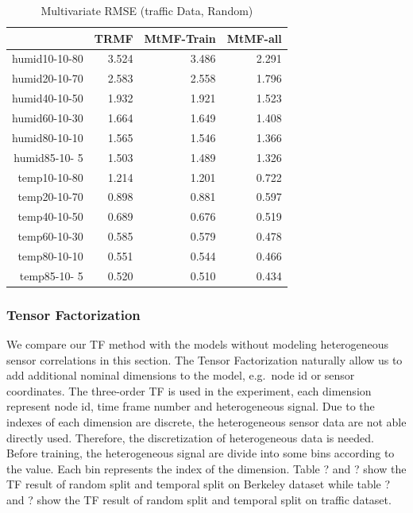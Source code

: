 \begin{table}[htbp]
\caption{Multivariate RMSE (traffic Data, Random)}
\label{traffic}
\begin{tabular}{r | r r r}
	&TRMF	&MtMF-Train	&MtMF-all \\ \hline
humid10-10-80	&3.524 	&3.486 	&2.291\\  
humid20-10-70	&2.583 	&2.558 	&1.796\\
humid40-10-50	&1.932 	&1.921 	&1.523\\
humid60-10-30	&1.664 	&1.649 	&1.408\\
humid80-10-10	&1.565 	&1.546 	&1.366\\
humid85-10- 5	&1.503 	&1.489 	&1.326\\
 temp10-10-80	&1.214 	&1.201 	&0.722\\
 temp20-10-70	&0.898 	&0.881 	&0.597\\
 temp40-10-50	&0.689 	&0.676 	&0.519\\
 temp60-10-30	&0.585 	&0.579 	&0.478\\
 temp80-10-10	&0.551 	&0.544 	&0.466\\
 temp85-10- 5	&0.520 	&0.510 	&0.434\\
\end{tabular}
\end{table}

\subsubsection{Tensor Factorization} %
We compare our TF method with the models without modeling heterogeneous sensor correlations in this section.
The Tensor Factorization naturally allow us to add additional nominal dimensions to the model, e.g.\ node id or sensor coordinates.
The three-order TF is used in the experiment, each dimension represent node id, time frame number and heterogeneous signal.  
Due to the indexes of each dimension are discrete, the heterogeneous sensor data are not able directly used.
Therefore, the discretization of heterogeneous data is needed.
Before training, the heterogeneous signal are divide into some bins according to the value.
Each bin represents the index of the dimension.
Table ? and ? show the TF result of random split and temporal split on Berkeley dataset while table ? and ? show the TF result of random split and temporal split on traffic dataset.

